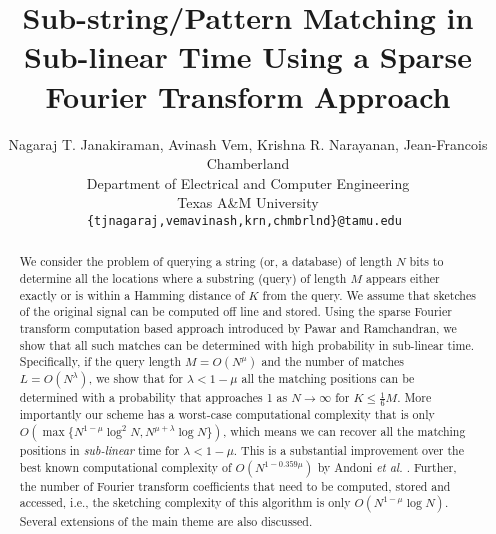 \documentclass[sigconf]{acmart}
\begin{document}
\title[Sub-string Matching in Sub-linear Time]{Sub-string/Pattern Matching in Sub-linear Time Using a Sparse Fourier Transform Approach}

\author{Nagaraj T. Janakiraman, Avinash Vem, Krishna R. Narayanan, Jean-Francois Chamberland\\
Department of Electrical and Computer Engineering \\
Texas A\&M University\\
{\tt\small {\{tjnagaraj,vemavinash,krn,chmbrlnd\}@tamu.edu} }}

\renewcommand{\shortauthors}{Janakiraman et al.}

\begin{abstract}
	We consider the problem of querying a string (or, a database) of length $N$ bits to determine all the locations where a substring (query) of length $M$ appears either exactly or is within a Hamming distance of $K$ from the query. We assume that sketches of the original signal can be computed off line and stored. Using the sparse Fourier transform computation based approach introduced by Pawar and Ramchandran, we show that all such matches can be determined with high probability in sub-linear time. Specifically, if the query length $M = O(N^\mu)$ and the number of matches $L=O(N^\lambda)$, %
we show that for $\lambda < 1-\mu$ all the matching positions can be determined with a probability that approaches 1 as $N \rightarrow \infty$ for $K \leq \frac{1}{6}M$. More importantly our scheme has a worst-case computational complexity that is only $O\left(\max\{N^{1-\mu}\log^2 N, N^{\mu+\lambda}\log N \}\right)$, which means we can recover all the matching positions in {\it sub-linear} time for $\lambda<1-\mu$. This is a substantial improvement over the best known computational complexity of $O\left(N^{1-0.359 \mu} \right)$ by Andoni {\em et al.} \cite{andoni2013shift}. Further, the number of Fourier transform coefficients that need to be computed, stored and accessed, i.e., the sketching complexity of this algorithm is only $O\left(N^{1-\mu}\log N\right)$. Several extensions of the main theme are also discussed.
\end{abstract}

\end{document}
